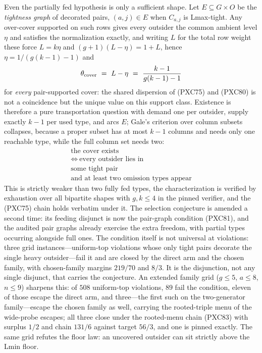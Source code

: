 \documentclass[11pt]{article}
\begin{document}
Even the partially fed hypothesis is only a sufficient shape.  Let
$E\subseteq G\times O$ be the \emph{tightness graph} of decorated
pairs, $(a,j)\in E$ when $C_{a,j}$ is Lmax-tight.  Any over-cover
supported on such rows gives every outsider the common ambient level
$\eta$ and satisfies the normalization exactly, and writing $L$ for
the total row weight these force $L=k\eta$ and $(g+1)(L-\eta)=1+L$,
hence $\eta=1/(g(k-1)-1)$ and
\[
 \theta_{\rm cover}\ =\ L-\eta\ =\ \frac{k-1}{g(k-1)-1}
\]
for \emph{every} pair-supported cover: the shared dispersion of
(PXC75) and (PXC80) is not a coincidence but the unique value on this
support class.  Existence is therefore a pure transportation question
with demand one per outsider, supply exactly $k-1$ per used type, and
arcs $E$; Gale's criterion over column subsets collapses, because a
proper subset has at most $k-1$ columns and needs only one reachable
type, while the full column set needs two:
\[
 \begin{gathered}
 \text{the cover exists}\\
 \Longleftrightarrow\ \text{every outsider lies in}\\
 \text{some tight pair}\\
 \text{and at least two omission types appear}
 \end{gathered}                                      \tag{PXC81}
\]
This is strictly weaker than two fully fed types, the characterization
is verified by exhaustion over all bipartite shapes with
$g,k\le4$ in the pinned verifier, and the (PXC75) chain holds verbatim
under it.  The selection conjecture is amended a second time: its
feeding disjunct is now the pair-graph condition (PXC81), and the
audited pair graphs already exercise the extra freedom, with partial
types occurring alongside full ones.  The condition itself is not
universal at violations: three grid instances---uniform-top violations
whose only tight pairs decorate the single heavy outsider---fail it and
are closed by the direct arm and the chosen family, with chosen-family
margins $219/70$ and $8/3$.  It is the disjunction, not any single
disjunct, that carries the conjecture.  An extended family grid
($g\le5$, $a\le8$, $n\le9$) sharpens this: of $508$ uniform-top
violations, $89$ fail the condition, eleven of those escape the direct
arm, and three---the first such on the two-generator family---escape
the chosen family as well, carrying the rooted-triple menu of the
wide-probe escapes; all three close under the rooted-menu chain
(PXC83) with surplus $1/2$ and chain $131/6$ against target $56/3$,
and one is pinned exactly.  The same grid refutes the floor law: an
uncovered outsider can sit strictly above the Lmin floor.
\end{document}
